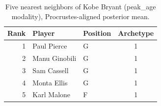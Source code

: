 \begin{table}[htbp]
  \centering\small
  \begin{tabular}{rllc}
    \toprule
    Rank & Player & Position & Archetype \\
    \midrule
    1 & Paul Pierce & G & 1 \\
    2 & Manu Ginobili & G & 1 \\
    3 & Sam Cassell & G & 1 \\
    4 & Monta Ellis & G & 1 \\
    5 & Karl Malone & F & 1 \\
    \bottomrule
  \end{tabular}
  \caption{Five nearest neighbors of Kobe Bryant (peak_age modality), Procrustes-aligned posterior mean.}
  \label{tab:Kobe_Bryant_neighbors_peak_age}
\end{table}

